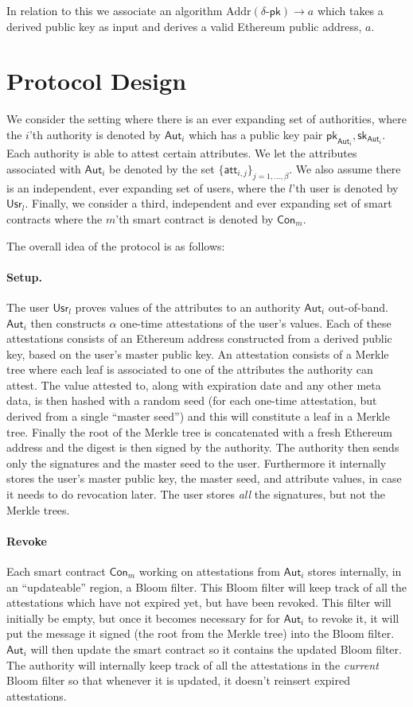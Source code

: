 \documentclass[11pt]{article} %
\newcommand{\aut}{\ensuremath{\mathsf{Aut}_i}}
\newcommand{\usr}{\ensuremath{\mathsf{Usr}_l}}
\newcommand{\con}{\ensuremath{\mathsf{Con}_m}}
\newcommand{\pk}{\ensuremath{\mathsf{pk}}}
\newcommand{\sk}{\ensuremath{\mathsf{sk}}}
\newcommand{\Addr}{\ensuremath{\mathrm{Addr}}}
\begin{document}
In relation to this we associate an algorithm $\Addr (\delta\mbox{-}\pk)\to a$ which takes a derived public key as input and derives a valid Ethereum public address, $a$.

\section{Protocol Design}
We consider the setting where there is an ever expanding set of authorities, where the $i$'th authority is denoted by $\mathsf{Aut}_i$ which has a public key pair $\pk_{\aut}, \sk_{\aut}$. Each authority is able to attest certain attributes. We let the attributes associated with $\mathsf{Aut}_i$ be denoted by the set $\{\mathsf{att}_{i,j}\}_{j=1, \dots, \beta}$. We also assume there is an independent, ever expanding set of users, where the $l$'th user is denoted by $\mathsf{Usr}_l$. Finally, we consider a third, independent and ever expanding set of smart contracts where the $m$'th smart contract is denoted by $\mathsf{Con}_m$.

The overall idea of the protocol is as follows:
\paragraph{Setup.} The user $\usr$ proves values of the attributes to an authority $\aut$ out-of-band. $\aut$ then constructs $\alpha$ one-time attestations of the user's values. Each of these attestations consists of an Ethereum address constructed from a derived public key, based on the user's master public key. An attestation consists of a Merkle tree where each leaf is associated to one of the attributes the authority can attest. The value attested to, along with expiration date and any other meta data, is then hashed with a random seed (for each one-time attestation, but derived from a single ``master seed'') and this will constitute a leaf in a Merkle tree. Finally the root of the Merkle tree is concatenated with a fresh Ethereum address and the digest is then signed by the authority. The authority then sends only the signatures and the master seed to the user. Furthermore it internally stores the user's master public key, the master seed, and attribute values, in case it needs to do revocation later. The user stores \emph{all} the signatures, but not the Merkle trees.

\paragraph{Revoke}
Each smart contract $\con$ working on attestations from $\aut$ stores internally, in an ``updateable'' region, a Bloom filter. This Bloom filter will keep track of all the attestations which have not expired yet, but have been revoked. This filter will initially be empty, but once it becomes necessary for for $\aut$ to revoke it, it will put the message it signed (the root from the Merkle tree) into the Bloom filter. $\aut$ will then update the smart contract so it contains the updated Bloom filter. The authority will internally keep track of all the attestations in the \emph{current} Bloom filter so that whenever it is updated, it doesn't reinsert expired attestations.
\end{document}
